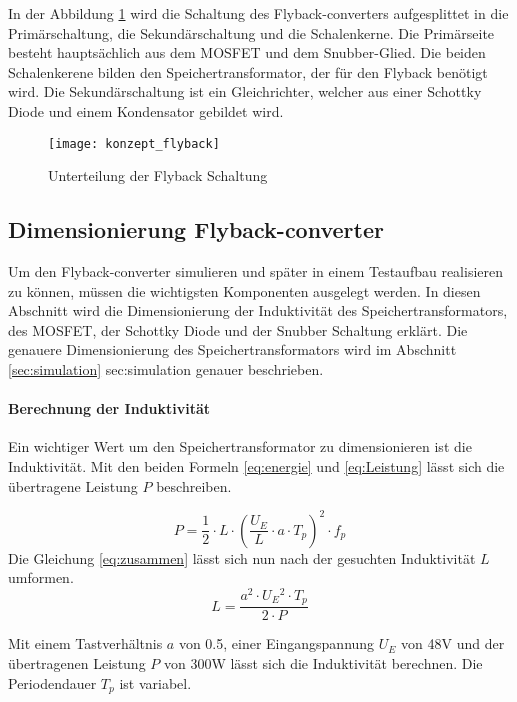 In der Abbildung \ref{fig:konzept_flyback} wird die Schaltung des Flyback-converters aufgesplittet in die Primärschaltung, die Sekundärschaltung und die Schalenkerne. Die Primärseite besteht hauptsächlich aus dem MOSFET und dem Snubber-Glied. Die beiden Schalenkerene bilden den Speichertransformator, der für den Flyback benötigt wird. Die Sekundärschaltung ist ein Gleichrichter, welcher aus einer Schottky Diode und einem Kondensator gebildet wird.
\begin{figure}[h]
	\centering
	\texttt{[image: konzept\_flyback]}
	\caption{Unterteilung der Flyback Schaltung}\label{fig:konzept_flyback}
\end{figure}


\subsection{Dimensionierung Flyback-converter}
Um den Flyback-converter simulieren und später in einem Testaufbau realisieren zu können, müssen die wichtigsten Komponenten ausgelegt werden. In diesen Abschnitt wird die Dimensionierung der Induktivität des Speichertransformators, des MOSFET, der Schottky Diode und der Snubber Schaltung erklärt. Die genauere Dimensionierung des Speichertransformators wird im Abschnitt \ref{sec:simulation} \refname{sec:simulation} genauer beschrieben.

\paragraph{Berechnung der Induktivität}
Ein wichtiger Wert um den Speichertransformator zu dimensionieren ist die Induktivität. Mit den beiden Formeln \ref{eq:energie} und \ref{eq:Leistung} lässt sich die übertragene Leistung $ P $ beschreiben. 

\begin{equation}\label{eq:zusammen}
P = \frac{1}{2} \cdot L \cdot \left (\frac{U_{E}}{L}\cdot a \cdot T_{p}\right ) ^{2} \cdot f_{p}
\end{equation}
Die Gleichung \ref{eq:zusammen} lässt sich nun nach der gesuchten Induktivität $ L $ umformen.
\begin{equation}\label{eq:induktivität}
L = \frac{a^{2}\cdot U_{E}\!^{2}\cdot T_{p}}{2 \cdot P}
\end{equation}

Mit einem Tastverhältnis $ a $ von 0.5, einer Eingangspannung $ U_{E} $ von 48V und der übertragenen Leistung $ P $ von 300W lässt sich die Induktivität berechnen. Die Periodendauer $ T_{p} $ ist variabel.

